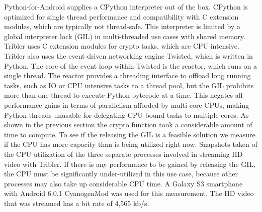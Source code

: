 Python-for-Android supplies a CPython interpreter out of the box.
CPython is optimized for single thread performance and compatibility with C extension modules, which are typically not thread-safe.
This interpreter is limited by a global interpreter lock (GIL) in multi-threaded use cases with shared memory.
Tribler uses C extension modules for crypto tasks, which are CPU intensive.
Tribler also uses the event-driven networking engine Twisted, which is written in Python.
The core of the event loop within Twisted is the reactor, which runs on a single thread.
The reactor provides a threading interface to offload long running tasks, such as IO or CPU intensive tasks to a thread pool, but the GIL prohibits more than one thread to execute Python bytecode at a time.
This negates all performance gains in terms of parallelism afforded by multi-core CPUs, making Python threads unusable for delegating CPU bound tasks to multiple cores.
As shown in the previous section the crypto function took a considerable amount of time to compute.
To see if the releasing the GIL is a feasible solution we measure if the CPU has more capacity than is being utilized right now.
Snapshots taken of the CPU utilization of the three separate processes involved in streaming HD video with Tribler.
If there is any performance to be gained by releasing the GIL, the CPU must be significantly under-utilized in this use case, because other processes may also take up considerable CPU time.
A Galaxy S3 smartphone with Android 6.0.1 CyanogenMod was used for this measurement.
The HD video that was streamed has a bit rate of 4,565 kb/s.
